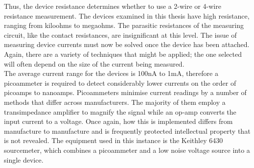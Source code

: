 

\noindent Thus, the device resistance determines whether to use a 2-wire or 4-wire resistance measurement. The devices examined in this thesis have high resistance, ranging from kiloohms to megaohms. The parasitic resistances of the measuring circuit, like the contact resistances, are insignificant at this level. The issue of measuring device currents must now be solved once the device has been attached. Again, there are a variety of techniques that might be applied; the one selected will often depend on the size of the current being measured. \\

\noindent The average current range for the devices is 100nA to 1mA, therefore a picoammeter is required to detect considerably lower currents on the order of picoamps to nanoamps. Picoammeters minimise current readings by a number of methods that differ across manufacturers. The majority of them employ a transimpedance amplifier to magnify the signal while an op-amp converts the input current to a voltage. Once again, how this is implemented differs from manufacture to manufacture and is frequently protected intellectual property that is not revealed. The equipment used in this instance is the Keithley 6430 sourcemeter, which combines a picoammeter and a low noise voltage source into a single device. \\

